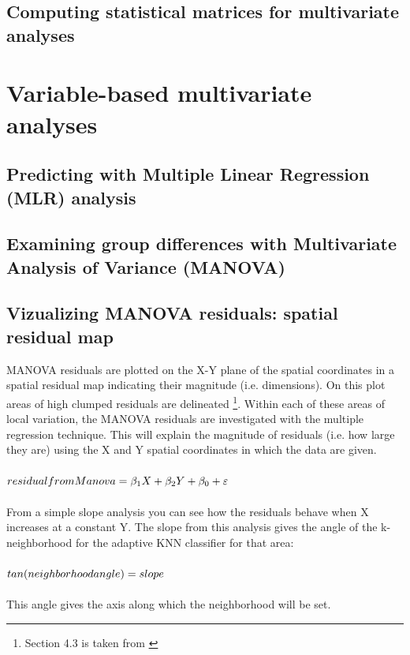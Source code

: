 \documentclass {article}
\begin{document}
      
\subsection {Computing statistical matrices for multivariate analyses}

 
\section {Variable-based multivariate analyses}

\subsection{Predicting with Multiple Linear Regression (MLR) analysis}

\subsection {Examining group differences with Multivariate Analysis of Variance (MANOVA)}

\subsection {Vizualizing MANOVA residuals: spatial residual map}

MANOVA residuals are plotted on the X-Y plane of the spatial coordinates in a spatial residual map indicating their magnitude (i.e. dimensions). On this plot areas of high clumped residuals are delineated \footnote {Section 4.3 is taken from \cite{tesileanu_geostatistics_2017}}.  
Within each of these areas of local variation, the MANOVA residuals are investigated with the multiple regression technique. This will explain the magnitude of residuals (i.e. how large they are) using the X and Y spatial coordinates in which the data are given.
\\
\\
$residual\underline{\space}from\underline{\space}Manova = \beta_1 X + \beta_2 Y + \beta_0 + \varepsilon$
\\
\\
From a simple slope analysis you can see how the residuals behave when X increases at a constant Y.
 The slope from this analysis gives the angle of the k-neighborhood for the adaptive KNN classifier for that area:
\\
\\
$ tan(neighborhood\underline{\space}angle) = slope $
\\
\\
This angle gives the axis along which the neighborhood will be set.
 
\end{document}
